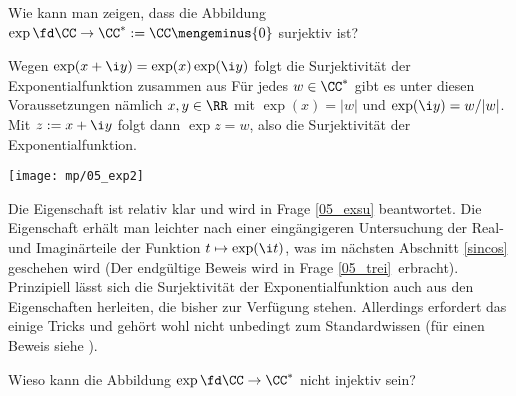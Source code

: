 \begin{frage}\label{05_exho}
  Wie kann man zeigen, dass die Abbildung 
  $\exp\fd\CC\to\CC^{\ast} := \CC \mengeminus \{ 0\}$
  surjektiv ist? 
\end{frage}

\begin{antwort}
  Wegen $\exp(x+\i y)=\exp(x)\exp (\i y)$ folgt die 
  Surjektivität der Exponentialfunktion zusammen aus
  Für jedes $w\in\CC^*$ gibt es unter diesen Voraussetzungen
  nämlich $x,y\in\RR$ mit $\exp(x)=|w|$ und $\exp(\i y)=w/|w|$. 
  Mit $z:=x+\i y$ folgt dann $\exp z=w$, also die Surjektivität der 
  Exponentialfunktion. 

  \begin{center}
    \texttt{[image: mp/05\_exp2]}
    \label{fig:05_exp2}
  \end{center}

  Die Eigenschaft  ist relativ klar und 
  wird in Frage \ref{05_exsu} beantwortet. 
  Die Eigenschaft  erhält man leichter nach einer 
  eingängigeren Untersuchung der Real- und Imaginärteile der Funktion 
  $t \mapsto \exp(\i t)$, was im nächsten Abschnitt \ref{sincos}  
  geschehen wird (Der endgültige Beweis wird in Frage \ref{05_trei}\, 
  erbracht). Prinzipiell lässt sich die Surjektivität der 
  Exponentialfunktion auch aus den Eigenschaften herleiten, 
  die bisher zur Verfügung stehen. Allerdings erfordert das 
  einige Tricks und gehört wohl 
  nicht unbedingt zum Standardwissen (für einen Beweis siehe 
  \citep{Ebbinghaus}).
\end{antwort}

\begin{frage}\label{05_exin}
  Wieso kann die Abbildung $\exp\fd\CC\to\CC^{\ast}$ nicht 
  injektiv sein?
\end{frage} 


